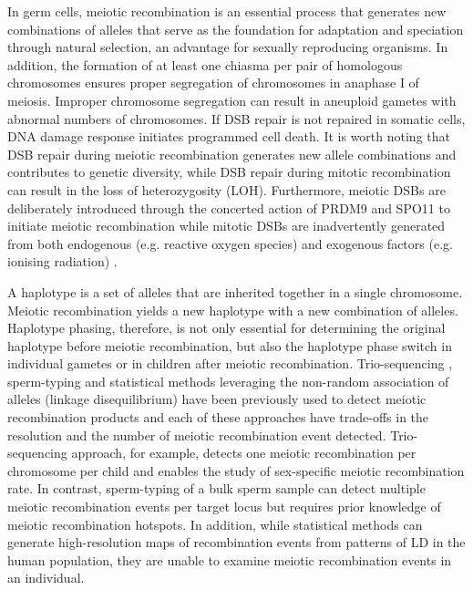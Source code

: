 In germ cells, meiotic recombination is an essential process that generates new combinations of alleles that serve as the foundation for adaptation and speciation through natural selection, an advantage for sexually reproducing organisms. In addition, the formation of at least one chiasma per pair of homologous chromosomes ensures proper segregation of chromosomes in anaphase I of meiosis. Improper chromosome segregation can result in aneuploid gametes with abnormal numbers of chromosomes. If DSB repair is not repaired in somatic cells, DNA damage response initiates programmed cell death. It is worth noting that DSB repair during meiotic recombination generates new allele combinations and contributes to genetic diversity, while DSB repair during mitotic recombination can result in the loss of heterozygosity (LOH). Furthermore, meiotic DSBs are deliberately introduced through the concerted action of PRDM9 and SPO11 to initiate meiotic recombination \cite{} while mitotic DSBs are inadvertently generated from both endogenous (e.g. reactive oxygen species) and exogenous factors (e.g. ionising radiation) \cite{}.

A haplotype is a set of alleles that are inherited together in a single chromosome. Meiotic recombination yields a new haplotype with a new combination of alleles. Haplotype phasing, therefore, is not only essential for determining the original haplotype before meiotic recombination, but also the haplotype phase switch in individual gametes or in children after meiotic recombination. Trio-sequencing \cite{}, sperm-typing \cite{} and statistical methods leveraging the non-random association of alleles (linkage disequilibrium) \cite{} have been previously used to detect meiotic recombination products and each of these approaches have trade-offs in the resolution and the number of meiotic recombination event detected. Trio-sequencing approach, for example, detects one meiotic recombination per chromosome per child and enables the study of sex-specific meiotic recombination rate. In contrast, sperm-typing of a bulk sperm sample can detect multiple meiotic recombination events per target locus but requires prior knowledge of meiotic recombination hotspots. In addition, while statistical methods can generate high-resolution maps of recombination events from patterns of LD in the human population, they are unable to examine meiotic recombination events in an individual.  

